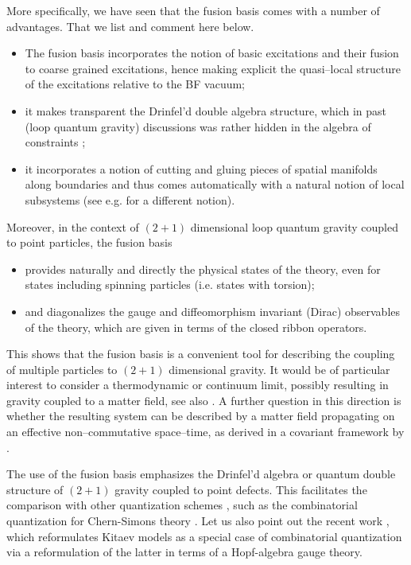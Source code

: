 \documentclass[nofootinbib,superscriptaddress,eqsecnum,tightenlines,11pt]{revtex4-1}
\begin{document}
 More specifically, we have seen that the  fusion basis comes with a number of advantages. That we list and comment here below.
\begin{itemize}
\item The fusion basis incorporates the notion of basic excitations and their fusion to coarse grained excitations, hence making explicit the quasi--local structure of the excitations relative to the BF vacuum;
\item it makes transparent the Drinfel'd double algebra structure, which in past (loop quantum gravity) discussions was rather hidden in the algebra of constraints \cite{BonzomEtAl, PranzEtAl}; 
\item it incorporates a notion of cutting and gluing pieces of spatial manifolds along boundaries and thus comes automatically with a natural notion of local subsystems (see e.g. \cite{DonnFreid} for a different notion).
\end{itemize}
Moreover, in the context of $(2+1)$ dimensional loop quantum gravity coupled to point particles, the fusion basis
\begin{itemize}
\item  provides naturally and directly the physical states of the theory, even for states including spinning particles (i.e. states with torsion);
\item and diagonalizes the gauge and diffeomorphism invariant (Dirac) observables of the theory, which are given in terms of the closed ribbon operators.
\end{itemize}
This shows that the fusion basis is a convenient tool for describing the coupling of multiple particles to $(2+1)$ dimensional gravity. It would be of particular interest to consider a thermodynamic or continuum limit, possibly resulting in gravity coupled to a matter field, see also \cite{Karim2}. A further question in this direction is whether the resulting system can be described by a matter field propagating on an effective non--commutative space--time, as derived in a covariant framework by \cite{FreidelLivine}.

The use of the fusion basis emphasizes the Drinfel'd algebra or quantum double  structure of $(2+1)$ gravity coupled to point defects. This facilitates the comparison with other quantization schemes \cite{KarimCath}, such as the combinatorial quantization for Chern-Simons theory \cite{Rosly}.  Let us also point out the recent work \cite{MeusRecent}, which reformulates Kitaev models as a special case of combinatorial quantization via a reformulation of the latter in terms of a Hopf-algebra gauge theory.
~\\
\end{document}
